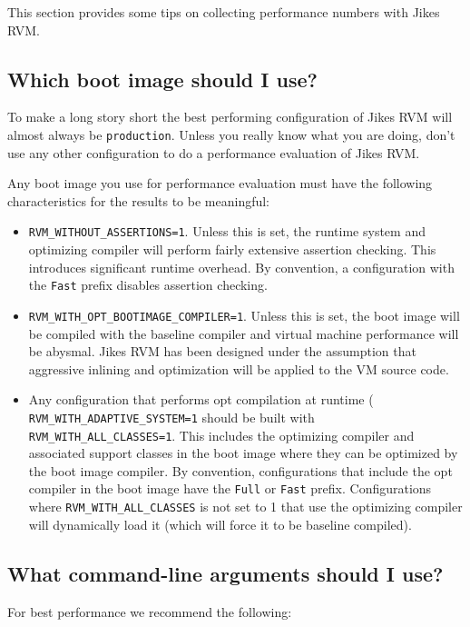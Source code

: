 This section provides some tips on collecting performance numbers with
Jikes RVM.

\subsection{Which boot image should I use?}

To make a long story short the best performing configuration of Jikes
RVM will almost always be {\tt production}.  Unless you really know
what you are doing, don't use any other configuration to do a
performance evaluation of Jikes RVM. 

Any boot image you use for performance evaluation must have the
following characteristics for the results to be meaningful:
\begin{itemize} 
\item {\tt RVM\_WITHOUT\_ASSERTIONS=1}. Unless this is set, the runtime
system and optimizing compiler will perform fairly extensive assertion
checking. This introduces significant runtime overhead. By convention,
a configuration with the {\tt Fast} prefix disables assertion
checking.
\item {\tt RVM\_WITH\_OPT\_BOOTIMAGE\_COMPILER=1}. Unless this is set, the
boot image will be compiled with the baseline compiler and virtual
machine performance will be abysmal.  Jikes RVM has been designed
under the assumption that aggressive inlining and optimization will be
applied to the VM source code. 
\item Any configuration that performs opt compilation at runtime (
{\tt RVM\_\-WITH\_\-A\-DAP\-TIVE\_\-SYS\-TEM=1} should be built with {\tt
RVM\_\-WITH\_\-ALL\_\-CLAS\-SES=1}.  This includes the optimizing compiler and
associated support classes in the boot image where they can be
optimized by the boot image compiler. By convention, configurations
that include the opt compiler in the boot image have the {\tt Full} or
{\tt Fast} prefix.  Configurations where {\tt RVM\_WITH\_ALL\_CLASSES}
is not set to 1 that use the optimizing compiler will dynamically load
it (which will force it to be baseline compiled).
\end{itemize}

\subsection{What command-line arguments should I use?}

For best performance we recommend the following:

